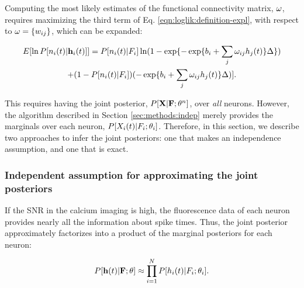 Computing the most likely estimates of the functional connectivity matrix, $\mathbf{\omega}$, requires maximizing the third term of Eq. \eqref{eqn:loglik:definition-expl}, with respect to $\mathbf{\omega}=\{w_{ij}\}$, which can be expanded:

\begin{multline} \label{eqn:bws}
	E [\ln P[n_i(t) | \mathbf{h}_i(t)]] = P[n_i(t) | F_i] \ln (1-\exp\{-\exp\{b_i + \sum_j \omega_{ij} h_j(t)\}\Delta\})
	\\ +  (1-P[n_i(t) | F_i]) (-\exp\{b_i + \sum_j \omega_{ij} h_j(t)\}\Delta)].
\end{multline}

\noindent This requires having the joint posterior, $P[{\bf X} | {\bf F}; \mathbf{\theta}^n]$, over \emph{all} neurons.  However, the algorithm described in Section \ref{sec:methods:indep} merely provides the marginals over each neuron, $P[X_i(t) | F_i; \mathbf{\theta}_i]$.  Therefore, in this section, we describe two approaches to infer the joint posteriors: one that makes an independence assumption, and one that is exact.

\subsubsection{Independent assumption for approximating the joint posteriors}

If the SNR in the calcium imaging is high,  the fluorescence data of each neuron provides nearly all the information about spike times.  Thus, the joint posterior approximately factorizes into a product of the marginal posteriors for each neuron:

\begin{equation} \label{eqn:indep_approx}
	P[{\bf h}(t)|{\bf F};\theta]  \approx \prod_{i=1}^N P[h_i(t)|F_i; \mathbf{\theta}_i]. \end{equation}
	
